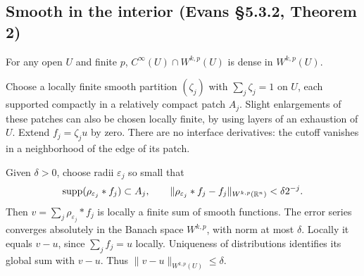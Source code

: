 \subsection{Smooth in the interior (Evans \S5.3.2, Theorem 2)}
\begin{theorem}
For any open $U$ and finite $p$, $C^\infty(U)\cap W^{k,p}(U)$ is dense
in $W^{k,p}(U)$.
\end{theorem}
\begin{expandedproof}
Choose a locally finite smooth partition $(\zeta_j)$ with
$\sum_j\zeta_j=1$ on $U$, each supported compactly in a relatively
compact patch $A_j$. Slight enlargements of these patches can also be
chosen locally finite, by using layers of an exhaustion of $U$.
Extend $f_j=\zeta_j u$ by zero. There are no interface derivatives:
the cutoff vanishes in a neighborhood of the edge of its patch.

Given $\delta>0$, choose radii $\varepsilon_j$ so small that
\[
 \operatorname{supp}(\rho_{\varepsilon_j}*f_j)\subset A_j,\qquad
 \|\rho_{\varepsilon_j}*f_j-f_j\|_{W^{k,p}(\mathbb{R}^n)}
 <\delta2^{-j}.
\]
Then $v=\sum_j\rho_{\varepsilon_j}*f_j$ is locally a finite sum of
smooth functions. The error series converges absolutely in the Banach
space $W^{k,p}$, with norm at most $\delta$. Locally it equals $v-u$,
since $\sum_j f_j=u$ locally. Uniqueness of distributions identifies
its global sum with $v-u$. Thus $\|v-u\|_{W^{k,p}(U)}\leq\delta$.
\end{expandedproof}
\Needspace{45mm}

